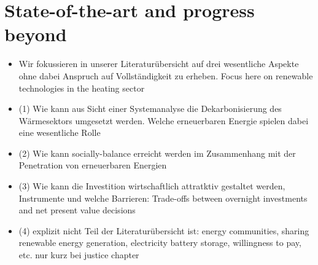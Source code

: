 \newpage
\section{State-of-the-art and progress beyond}\label{stateoftheart}
\begin{itemize}
	\item[\textcolor{col}{\textbullet}] \textcolor{col}{Wir fokussieren in unserer Literaturübersicht auf drei wesentliche Aspekte ohne dabei Anspruch auf Vollständigkeit zu erheben. Focus here on renewable technologies in the heating sector}
	\item[\textcolor{col}{\textbullet}] \textcolor{col}{(1) Wie kann aus Sicht einer Systemanalyse die Dekarbonisierung des Wärmesektors umgesetzt werden. Welche erneuerbaren Energie spielen dabei eine wesentliche Rolle} 
	\item[\textcolor{col}{\textbullet}] \textcolor{col}{(2) Wie kann socially-balance erreicht werden im Zusammenhang mit der Penetration von erneuerbaren Energien}
	\item[\textcolor{col}{\textbullet}] \textcolor{col}{(3) Wie kann die Investition wirtschaftlich attratktiv gestaltet werden, Instrumente und welche Barrieren: Trade-offs between overnight investments and net present value decisions}
	\item[\textcolor{col}{\textbullet}] \textcolor{col}{(4) explizit nicht Teil der Literaturübersicht ist: energy communities, sharing renewable energy generation, electricity battery storage, willingness to pay, etc. nur kurz bei justice chapter}
\end{itemize}

